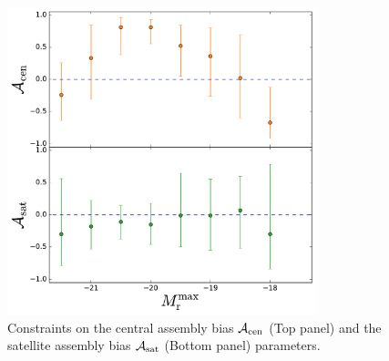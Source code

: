 \begin{figure}[p]~\\
\begin{center}
\includegraphics[width=0.8\textwidth]{bias2.pdf}
\caption{Constraints on the central assembly bias $\mathcal{A}_{\rm cen}$ (Top panel) and the satellite assembly bias $\mathcal{A}_{\rm sat}$ (Bottom panel) parameters. }
\label{fig:bias}
\end{center}
\end{figure}

\clearpage

